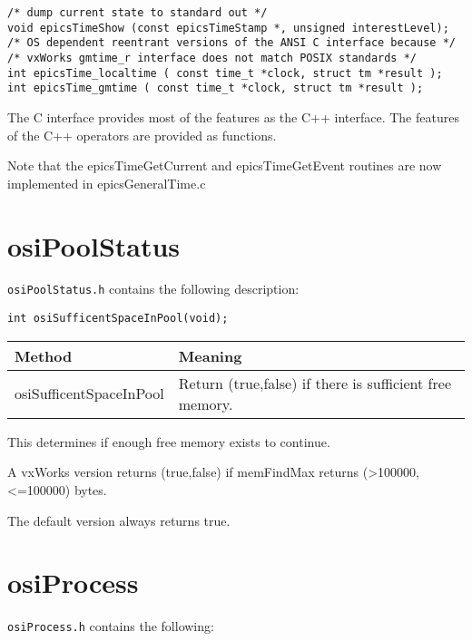 \begin{verbatim}
/* dump current state to standard out */
void epicsTimeShow (const epicsTimeStamp *, unsigned interestLevel);
/* OS dependent reentrant versions of the ANSI C interface because */
/* vxWorks gmtime_r interface does not match POSIX standards */
int epicsTime_localtime ( const time_t *clock, struct tm *result );
int epicsTime_gmtime ( const time_t *clock, struct tm *result );

\end{verbatim}

The C interface provides most of the features as the C++ interface. The features of the C++ operators are provided as 
functions.

Note that the epicsTimeGetCurrent and epicsTimeGetEvent routines are now implemented in epicsGeneralTime.c

\section{osiPoolStatus}

\verb|osiPoolStatus.h| contains the following description:

\begin{verbatim}
int osiSufficentSpaceInPool(void);
\end{verbatim}

\begin{center}
\begin{longtable}{p{1.52778in}p{3.40278in}}
\textbf{Method} & \textbf{Meaning}\\
\hline
osiSufficentSpaceInPool & Return (true,false) if there is sufficient free memory.
\end{longtable}

\end{center}


This determines if enough free memory exists to continue.

A vxWorks version returns (true,false) if memFindMax returns (\textgreater{}100000, \textless{}=100000) bytes.

The default version always returns true.

\section{osiProcess}

\verb|osiProcess.h| contains the following:

